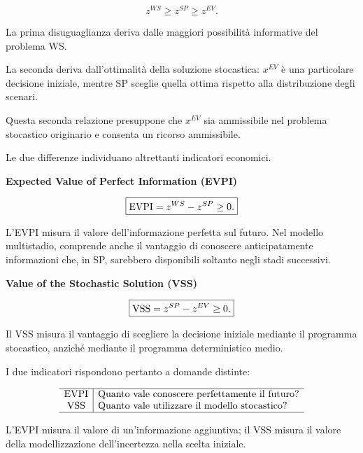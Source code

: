 \begin{equation}
\boxed{
z^{WS}\geq z^{SP}\geq z^{EV}.
}
\label{eq:cap15-ordinamento-benchmark-v2}
\end{equation}

La prima disuguaglianza deriva
dalle maggiori possibilit\`a
informative del problema WS.

La seconda deriva dall'ottimalit\`a
della soluzione stocastica:
$x^{EV}$ \`e una particolare decisione
iniziale, mentre SP sceglie quella ottima
rispetto alla distribuzione degli scenari.

Questa seconda relazione presuppone
che $x^{EV}$ sia ammissibile
nel problema stocastico originario
e consenta un ricorso ammissibile.

Le due differenze individuano
altrettanti indicatori economici.

\medskip

\noindent
\textbf{Expected Value of Perfect Information (EVPI)}

\begin{equation}
\boxed{
\operatorname{EVPI}=z^{WS}-z^{SP}\geq0.
}
\label{eq:cap15-evpi-v2}
\end{equation}

L'EVPI misura il valore dell'informazione
perfetta sul futuro.
Nel modello multistadio, comprende anche
il vantaggio di conoscere anticipatamente
informazioni che, in SP, sarebbero disponibili
soltanto negli stadi successivi.

\medskip

\noindent
\textbf{Value of the Stochastic Solution (VSS)}

\begin{equation}
\boxed{
\operatorname{VSS}=z^{SP}-z^{EV}\geq0.
}
\label{eq:cap15-vss-v2}
\end{equation}

Il VSS misura il vantaggio di scegliere
la decisione iniziale mediante
il programma stocastico, anzich\'e
mediante il programma deterministico medio.

\medskip

I due indicatori rispondono pertanto
a domande distinte:

\[
\begin{array}{c|l}
\hline
\operatorname{EVPI} &
\text{Quanto vale conoscere perfettamente il futuro?}
\\
\operatorname{VSS} &
\text{Quanto vale utilizzare il modello stocastico?}
\\
\hline
\end{array}
\]

L'EVPI misura il valore di un'informazione
aggiuntiva; il VSS misura il valore
della modellizzazione dell'incertezza
nella scelta iniziale.

